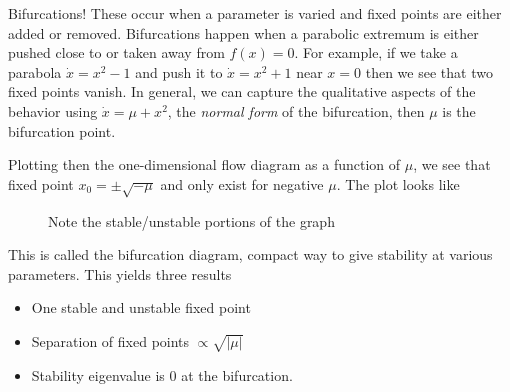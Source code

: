 \documentclass[10pt]{report}
\newcommand{\abs}[1]{\left|#1\right|}
\begin{document}
Bifurcations! These occur when a parameter is varied and fixed points are either added or removed. Bifurcations happen when a parabolic extremum is either pushed close to or taken away from $f(x) = 0$. For example, if we take a parabola $\dot{x} = x^2 - 1$ and push it to $\dot{x} = x^2 + 1$ near $x=0$ then we see that two fixed points vanish. In general, we can capture the qualitative aspects of the behavior using $\dot{x} = \mu + x^2$, the \emph{normal form} of the bifurcation, then $\mu$ is the bifurcation point. 

Plotting then the one-dimensional flow diagram as a function of $\mu$, we see that fixed point $x_0 = \pm \sqrt{-\mu}$ and only exist for negative $\mu$. The plot looks like
\begin{figure}[!h]
    \centering
    \caption{Note the stable/unstable portions of the graph}
\end{figure}

This is called the bifurcation diagram, compact way to give stability at various parameters. This yields three results
\begin{itemize}
    \item One stable and unstable fixed point
    \item Separation of fixed points $\propto \sqrt{\abs{\mu}}$
    \item Stability eigenvalue is $0$ at the bifurcation. 
\end{itemize}
\end{document}
